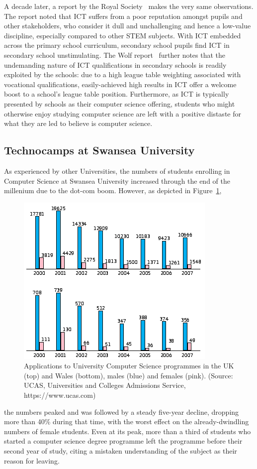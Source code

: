 \documentclass{sig-alternate}
\begin{document}
A decade later, a report by the Royal Society~\cite{RoyalSoc:2012}
makes the very same observations.  The report noted that ICT suffers
from a poor reputation amongst pupils and other stakeholders, who
consider it dull and unchallenging and hence a low-value discipline,
especially compared to other STEM subjects.  With ICT embedded across
the primary school curriculum, secondary school pupils find ICT in
secondary school unstimulating.  The Wolf report~\cite{Wolf:2011}
further notes that the undemanding nature of ICT qualifications in
secondary schools is readily exploited by the schools: due to a high
league table weighting associated with vocational qualifications,
easily-achieved high results in ICT offer a welcome boost to a
school's league table position.  Furthermore, as ICT is typically
presented by schools as their computer science offering, students who
might otherwise enjoy studying computer science are left with a
positive distaste for what they are led to believe is computer science.

\subsection{Technocamps at Swansea University}
As experienced by other Universities,
the numbers of students enrolling in Computer Science
at Swansea University increased through the end
of the millenium due to the dot-com boom.
However, as depicted in Figure~\ref{fig:numbers},
\begin{figure}
  \centering
  \includegraphics[width=0.9\columnwidth]{images/numbers.png}
  \caption{Applications to University Computer Science programmes
           in the UK (top) and Wales (bottom), males (blue) and females (pink).
           (Source: UCAS, Universities and Colleges Admissions Service,
            https://www.ucas.com)}
  \label{fig:numbers}
\end{figure}
the numbers peaked and was followed by
a steady five-year decline, dropping more than 40\% during that time,
with the worst effect on the already-dwindling numbers
of female students.
Even at its peak, more than a third of students who
started a computer science degree programme left
the programme before their second year of study,
citing a mistaken understanding of the subject
as their reason for leaving.
\end{document}
